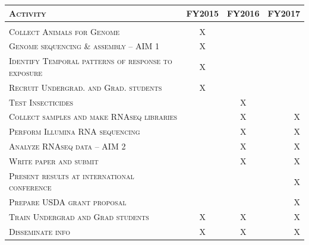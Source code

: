 \documentclass[11pt]{article}
\begin{document}
\begin{center}
\begin{tabular}{l|c c r}

\textsc{Activity} & \textsc{FY2015} & \textsc{FY2016} & \textsc{FY2017} \\
\hline \\
\textsc{Collect Animals for Genome} & X & & \\
\textsc{Genome sequencing \& assembly -- AIM 1 } & X & & \\
\textsc{Identify Temporal patterns of response to exposure} & X & & \\
\textsc{Recruit Undergrad. and Grad. students} & X & & \\
\textsc{Test Insecticides} & & X & \\
\textsc{Collect samples and make RNAseq libraries} & & X & X \\
\textsc{Perform Illumina RNA sequencing} & & X & X \\
\textsc{Analyze RNAseq data -- AIM 2} & & X & X \\
\textsc{Write paper and submit} & & X & X \\
\textsc{Present results at international conference} & & & X \\
\textsc{Prepare USDA grant proposal} & & & X \\
\textsc{Train Undergrad and Grad students} & X & X & X \\
\textsc{Disseminate info} & X & X & X \\

\end{tabular}
\end{center}
\end{document}

